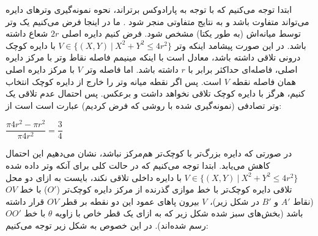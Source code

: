 \documentclass{scribe-cgenomics}
\begin{document}
\begin{حل}
ابتدا توجه می‌کنیم که با توجه به پارادوکس برتراند، نحوه نمونه‌گیری وترهای دایره می‌تواند متفاوت باشد و به نتایج متفاوتی منجر شود
\cite{bertrand_paradox}.
ما در اینجا فرض می‌کنیم یک وتر توسط میانه‌اش (به طور یکتا) مشخص شود. فرض کنیم دایره اصلی
$2r$
شعاع داشته باشد. در این صورت پیشامد اینکه وتر
$V \in \{(X,Y)\ |\ X^2+Y^2 \leq 4r^2\}$
با دایره کوچک درونی تلاقی داشته باشد، معادل است با اینکه مینیمم فاصله نقاط وتر با مرکز دایره اصلی، فاصله‌ای حداکثر برابر با
$r$
داشته باشد. اما فاصله وتر
$V$
با مرکز دایره اصلی همان فاصله نقطه
$V$
است. پس اگر نقطه میانه وتر را خارج از دایره کوچک انتخاب کنیم، هرگز با دایره کوچک تلاقی نخواهد داشت و برعکس. پس احتمال عدم تلاقی یک وتر تصادفی (نمونه‌گیری شده با روشی که فرض کردیم) عبارت است است از:

\begin{center}
$
\dfrac{\pi 4r^2 - \pi r^2}{\pi 4r^2} = \dfrac{3}{4}
$
\end{center}

در صورتی که دایره بزرگ‌تر با کوچک‌تر هم‌مرکز نباشد، نشان می‌دهیم این احتمال کاهش می‌یابد. ابتدا توجه می‌کنیم که در حالت کلی برای آنکه وتر داده شده
$V \in \{(X,Y)\ |\ X^2+Y^2 \leq 4r^2\}$
با دایره داخلی تلاقی نکند، بایست به ازای دو محل تلاقی دایره کوچک‌تر با خط موازی گذرنده از مرکز دایره کوچک‌تر
($O'$)
با خط
$OV$
(نقاط
$A'$
و
$B'$
در شکل زیر)، 
$V$
بیرون پاهای عمود این دو نقطه بر قطر
$OV$
قرار داشته باشد (بخش‌های سبز شده شکل زیر که به ازای یک قطر خاص با زاویه
$\theta$
با خط
$OO'$
رسم شده‌اند). در این خصوص به شکل زیر توجه می‌کنیم:

\bigbreak

\begin{figure}[h]
\centering
\end{figure}


\end{حل}
\end{document}

